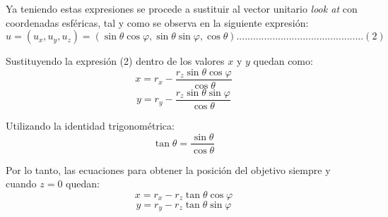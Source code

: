 \documentclass{book}
\begin{document}
Ya teniendo estas expresiones se procede a sustituir al vector unitario \textit{look at} con coordenadas esféricas, tal y como se observa en la siguiente expresión:
\[\hat{u}=(u_x, u_y, u_z)=(\sin{ \theta}\cos{\varphi},\sin{\theta}\sin{ \varphi},\cos{\theta})..............................................(2)\]

Sustituyendo la expresión (2) dentro de los valores $x$ y $y$ quedan como:
\[x=r_x - \frac{r_z \sin{ \theta} \cos{\varphi}}{\cos{\theta}}\]
\[y=r_y - \frac{r_z \sin{\theta} \sin{ \varphi}}{\cos{\theta}}\]

Utilizando la identidad trigonométrica:
\[\tan{\theta} = \frac{\sin{\theta}}{\cos{\theta}}\]

Por lo tanto, las ecuaciones para obtener la posición del objetivo siempre y cuando $z=0$ quedan:
\[x=r_x - r_z \tan{\theta}  \cos{\varphi}\]
\[y=r_y - r_z \tan{\theta} \sin{\varphi}\]
%


\end{document}
